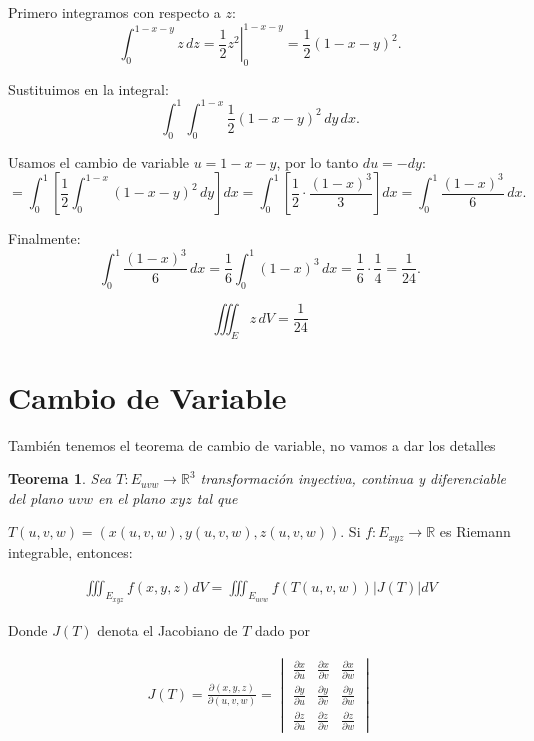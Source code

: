 \documentclass{article}
\theoremstyle{plain}
\newtheorem{thm}{Teorema}[section]
\theoremstyle{definition}
\begin{document}
Primero integramos con respecto a $z$:
\[
\int_0^{1 - x - y} z \, dz = \left. \frac{1}{2}z^2 \right|_0^{1 - x - y} = \frac{1}{2}(1 - x - y)^2.
\]

Sustituimos en la integral:
\[
\int_0^1 \int_0^{1 - x} \frac{1}{2}(1 - x - y)^2 \, dy \, dx.
\]

Usamos el cambio de variable $u = 1 - x - y$, por lo tanto $du = -dy$:
\[
= \int_0^1 \left[ \frac{1}{2} \int_0^{1 - x} (1 - x - y)^2 \, dy \right] dx
= \int_0^1 \left[ \frac{1}{2} \cdot \frac{(1 - x)^3}{3} \right] dx
= \int_0^1 \frac{(1 - x)^3}{6} \, dx.
\]

Finalmente:
\[
\int_0^1 \frac{(1 - x)^3}{6} \, dx = \frac{1}{6} \int_0^1 (1 - x)^3 \, dx = \frac{1}{6} \cdot \frac{1}{4} = \frac{1}{24}.
\]

\[
\boxed{\iiint_E z \, dV = \frac{1}{24}}
\]



\section{Cambio de Variable}

Tambi\'en tenemos el teorema de cambio de variable, no vamos a dar los detalles \\

\begin{thm}Sea $T: E_{uvw} \to \mathbb{R}^3$ transformaci\'on inyectiva, continua y diferenciable del plano $uvw$ en el plano $xyz$ tal que
\end{thm}
$T (u, v,w) = (x (u, v,w) , y (u, v,w) , z (u, v,w))$. Si
$f : E_{xyz} \to \mathbb{R}$ es Riemann integrable, entonces:

\begin{align*}
    \iiint_{E_{xyz}} f(x,y,z) dV = \iiint_{E_{uvw}} f(T(u,v,w))|J(T)|dV
\end{align*}

Donde $J(T)$ denota el Jacobiano de $T$ dado por

\begin{align*}
    J(T) = \frac{\partial(x,y,z)}{\partial(u,v,w)} = \begin{vmatrix}
        \frac{\partial x}{\partial u} & \frac{\partial x}{\partial v}& \frac{\partial x}{\partial w} \\
        \frac{\partial y}{\partial u} & \frac{\partial y}{\partial v} & \frac{\partial y}{\partial w} \\
        \frac{\partial z}{\partial u} & \frac{\partial z}{\partial v} & \frac{\partial z}{\partial w}
    \end{vmatrix}
\end{align*}
\end{document}
